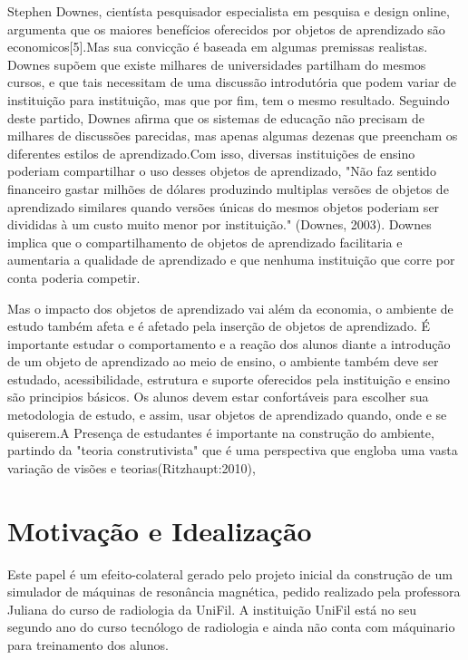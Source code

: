 \documentclass[12pt,openright,oneside,a4paper,english,french,spanish,brazil]{unifil}
\begin{document}
Stephen Downes, cientísta pesquisador especialista em pesquisa e design online, argumenta que os maiores benefícios oferecidos por objetos de aprendizado são economicos[5].Mas sua convicção é baseada em algumas premissas realistas.
Downes supõem que existe milhares de universidades partilham do mesmos cursos, e que tais necessitam de uma discussão introdutória que podem variar de instituição para instituição, mas que por fim, tem o mesmo resultado. Seguindo deste partido, Downes afirma que os sistemas de educação não precisam de milhares de discussões parecidas, mas apenas algumas dezenas que preencham os diferentes estilos de aprendizado.Com isso, diversas instituições de ensino poderiam compartilhar o uso desses objetos de aprendizado, "Não faz sentido financeiro gastar milhões de dólares produzindo multiplas versões de objetos de aprendizado similares quando versões únicas do mesmos objetos poderiam ser divididas à um custo muito menor por instituição." (Downes, 2003). Downes implica que o compartilhamento de objetos de aprendizado facilitaria e aumentaria a qualidade de aprendizado e que nenhuma instituição que corre por conta poderia competir.

Mas o impacto dos objetos de aprendizado vai além da economia, o ambiente de estudo também afeta e é afetado pela inserção de objetos de aprendizado. É importante estudar o comportamento e a reação dos alunos diante a introdução de um objeto de aprendizado ao meio de ensino, o ambiente também deve ser estudado, acessibilidade, estrutura e suporte oferecidos pela instituição e ensino são principios básicos. Os  alunos devem estar confortáveis para escolher sua metodologia de estudo, e assim, usar objetos de aprendizado quando, onde e se quiserem.A Presença de estudantes é importante na construção do ambiente, partindo da "teoria construtivista" que é uma perspectiva que engloba uma vasta variação de visões e teorias(Ritzhaupt:2010),

\chapter{Motivação e Idealização}%

Este papel é um efeito-colateral gerado pelo projeto inicial da construção de um simulador de máquinas de resonância magnética, pedido realizado pela professora Juliana do curso de radiologia da UniFil. A instituição UniFil está no seu segundo ano do curso tecnólogo de radiologia e ainda não conta com máquinario para treinamento dos alunos.
\end{document}
